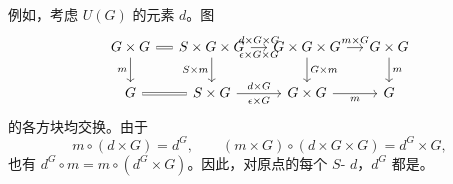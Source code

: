 例如，考虑 $U(G)$ 的元素 $d$。图
\[
\begin{tikzcd}[column sep=small]
G\times G\arrow[r,equal]\arrow[d,"m"']&S\times G\times G\arrow[r,"d\times G\times G","\epsilon\times G\times G"']\arrow[d,"S\times m"']&G\times G\times G\arrow[r,"m\times G"]\arrow[d,"G\times m"]&G\times G\arrow[d,"m"]\\
G\arrow[r,equal]&S\times G\arrow[r,"d\times G","\epsilon\times G"']&G\times G\arrow[r,"m"']&G
\end{tikzcd}
\]
的各方块均交换。由于
\[
m\circ(d\times G)=d^G,\qquad(m\times G)\circ(d\times G\times G)=d^G\times G,
\]
也有 $d^G\circ m=m\circ(d^G\times G)$。因此，对原点的每个 $S$- $d$，$d^G$ 都是。

